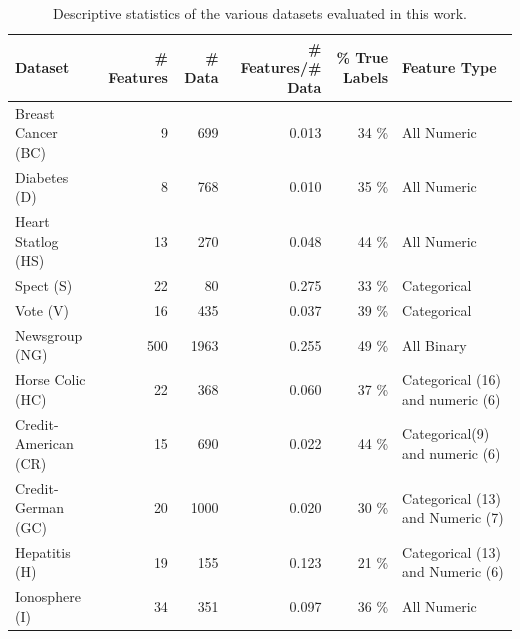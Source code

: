 \begin{table}[tbp!]
\centering
{\small 
\begin{tabular}{|l|r|r|r|r|l|} \hline
Dataset & \# Features & \# Data & \# Features/\# Data & \% True Labels & Feature Type\\ \hline \hline 
Breast Cancer (BC)	& 9	& 699	& 0.013	& 34 \%	& All Numeric\\ \hline
Diabetes (D)        & 8	& 768	& 0.010	& 35 \%	& All Numeric\\ \hline
Heart Statlog (HS)	& 13	& 270	& 0.048	& 44 \%	& All Numeric\\ \hline
Spect (S)	        & 22	& 80	& 0.275 & 33 \%	& Categorical\\ \hline
Vote (V)	        & 16	& 435	& 0.037	& 39 \%	& Categorical\\ \hline
Newsgroup (NG)	& 500	& 1963	& 0.255	& 49 \%	& All Binary\\ \hline
Horse Colic (HC)	& 22	& 368	& 0.060	& 37 \%	& Categorical (16) and numeric (6)\\ \hline
Credit-American (CR)	& 15	& 690	& 0.022	& 44 \%	& Categorical(9) and numeric (6)\\ \hline
Credit-German (GC)	& 20	& 1000	& 0.020 & 30 \%	& Categorical (13) and Numeric (7)\\ \hline
Hepatitis (H)	& 19	& 155	& 0.123	& 21 \%	& Categorical (13) and Numeric (6)\\ \hline
Ionosphere (I)	& 34	& 351	& 0.097	& 36 \%	& All Numeric\\ \hline
\end{tabular}}
\vspace{-2mm}
\caption{\footnotesize Descriptive statistics of the various datasets evaluated in this work.}
\label{table:stats}
\vspace{-3mm}
\end{table}

